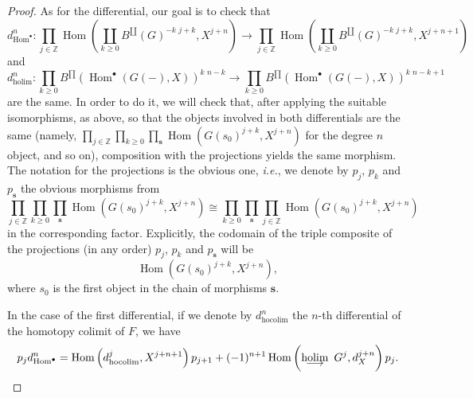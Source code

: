 \documentclass[reqno,11pt]{amsart}
\theoremstyle{plain}
\theoremstyle{remark}
\theoremstyle{definition}
\numberwithin{equation}{thm}
\newcommand{\ZZ}{\mathbb{Z}}
\newcommand{\hocolim}[1]{\begin{array}[t]{c} {\rm holim}\\[-7.5 pt]
		{\longrightarrow} \end{array}}
\newcommand{\lto}{\longrightarrow}
\DeclareMathOperator{\Hom}{Hom}
\begin{document}
\begin{proof}
		As for the differential, our goal is to check that
		\[
			d_{\Hom^\bullet}^n \colon \prod_{j \in \ZZ} \Hom\left(\coprod_{k \geq 0}B^{\coprod}(G)^{-k \,\, j+k}, X^{j+n}\right) \lto \prod_{j \in \ZZ} \Hom\left(\coprod_{k \geq 0}B^{\coprod}(G)^{-k \,\, j+k}, X^{j+n+1}\right)
		\]
		and
		\[
			d_{\text{holim}}^n \colon \prod_{k \geq 0} B^{\prod}\left(\Hom^\bullet(G(-), X)\right)^{k \,\, n-k} \lto \prod_{k \geq 0} B^{\prod}\left(\Hom^\bullet(G(-), X)\right)^{k \,\, n-k+1}
		\]
		are the same. In order to do it, we will check that, after applying the suitable isomorphisms, as above, so that the objects involved in both differentials are the same (namely, $\prod_{j \in \ZZ} \prod_{k \geq 0} \prod_{\textbf{s}}\Hom(G(s_0)^{j+k}, X^{j+n})$ for the degree $n$ object, and so on), composition with the projections yields the same morphism. The notation for the projections is the obvious one, \textit{i.e.}, we denote by $p_j$, $p_k$ and $p_{\textbf{s}}$ the obvious morphisms from
		\[
			\prod_{j \in \ZZ} \prod_{k \geq 0} \prod_{\textbf{s}}\Hom(G(s_0)^{j+k}, X^{j+n}) \cong \prod_{k \geq 0} \prod_{\textbf{s}} \prod_{j \in \ZZ} \Hom(G(s_0)^{j+k}, X^{j+n})
		\]
		in the corresponding factor. Explicitly, the codomain of the triple composite of the projections (in any order)  $p_j$, $p_k$ and $p_{\textbf{s}}$ will be
		\[
			\Hom(G(s_0)^{j+k}, X^{j+n}),
		\] 
		where $s_0$ is the first object in the chain of morphisms $\textbf{s}$.
		
		In the case of the first differential, if we denote by $d_{\text{hocolim}}^n$ the $n$-th differential of the homotopy colimit of $F$, we have 
		\begin{equation*}
			\begin{aligned}
				&p_j d_{\Hom^\bullet}^n = \Hom\left(d_{\text{hocolim}}^j, X^{j+n+1}\right) p_{j+1} + (-1)^{n+1} \Hom\left(\!\!\!\hocolim{}G^j, d_X^{j+n}\right) p_j. \\
			\end{aligned}	
		\end{equation*}
		

\end{proof}
\end{document}
